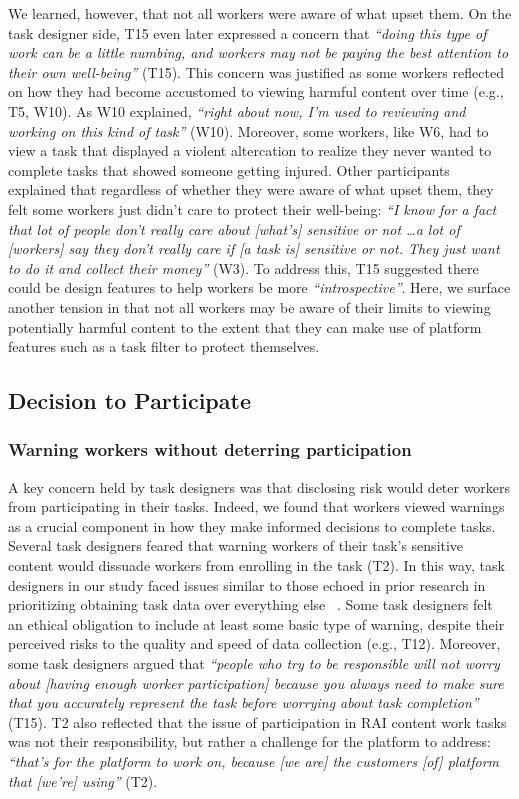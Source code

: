 We learned, however, that not all workers were aware of what upset them. On the task designer side, T15 even later expressed a concern that \textit{``doing this type of work can be a little numbing, and workers may not be paying the best attention to their own well-being''} (T15). This concern was justified as some  workers reflected on how they had become accustomed to viewing harmful content over time (e.g., T5, W10). As W10 explained, \textit{``right about now, I'm used to reviewing and working on this kind of task''} (W10). Moreover, some workers, like W6, had to view a task that displayed a violent altercation to realize they never wanted to complete tasks that showed someone getting injured. Other participants explained that regardless of whether they were aware of what upset them, they felt some workers just didn't care to protect their well-being: \textit{``I know for a fact that lot of people don't really care about [what's] sensitive or not \dots a lot of [workers] say they don't really care if [a task is] sensitive or not. They just want to do it and collect their money''} (W3). To address this, T15 suggested there could be design features to help workers be more \textit{``introspective''}. Here, we surface another tension in that not all workers may be aware of their limits to viewing potentially harmful content to the extent that they can make use of platform features such as a task filter to protect themselves.

\subsection{Decision to Participate}
\subsubsection{Warning workers without deterring participation}
A key concern held by task designers was that disclosing risk would deter workers from participating in their tasks. Indeed, we found that workers viewed warnings as a crucial component in how they make informed decisions to complete tasks. Several task designers feared that warning workers of their task's sensitive content would dissuade workers from enrolling in the task (T2). In this way, task designers in our study faced issues similar to those echoed in prior research in prioritizing obtaining task data over everything else ~\cite{qian2025locating, finnerty2013keep, kittur2008crowdsourcing}. Some task designers felt an ethical obligation to include at least some basic type of warning, despite their perceived risks to the quality and speed of data collection (e.g., T12). Moreover, some task designers argued that \textit{``people who try to be responsible will not worry about [having enough worker participation] because you always need to make sure that you accurately represent the task before worrying about task completion''} (T15). T2 also reflected that the issue of participation in RAI content work tasks was not their responsibility, but rather a challenge for the platform to address: \textit{``that's for the platform to work on, because [we are] the customers [of] platform that [we're] using''} (T2). 

